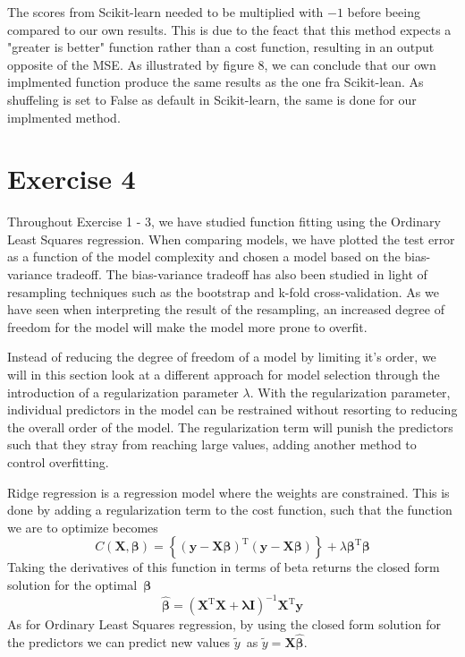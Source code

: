 \documentclass[11pt, a4paper]{article}
\begin{document}
The scores from Scikit-learn needed to be multiplied with $-1$ before beeing compared to our own results. This is due to the feact that this method expects a "greater is better" function rather than a cost function, resulting in an output opposite of the MSE.\cite{Geron2019} As illustrated by figure 8, we can conclude that our own implmented function produce the same results as the one fra Scikit-lean. As shuffeling is set to False as default in Scikit-learn, the same is done for our implmented method.





\section*{Exercise 4}
Throughout Exercise 1 - 3, we have studied function fitting using the Ordinary Least Squares regression. When comparing models, we have plotted the test error as a function of the model complexity and chosen a model based on the bias-variance tradeoff. The bias-variance tradeoff has also been studied in light of resampling techniques such as the bootstrap and k-fold cross-validation. As we have seen when interpreting the result of the resampling, an increased degree of freedom for the model will make the model more prone to overfit.

Instead of reducing the degree of freedom of a model by limiting it's order, we will in this section look at a different approach for model selection through the introduction of a regularization parameter $\lambda$. With the regularization parameter, individual predictors in the model can be restrained without resorting to reducing the overall order of the model. The regularization term will punish the predictors such that they stray from reaching large values, adding another method to control overfitting. \cite{Bishop2016}

Ridge regression is a regression model where the weights are constrained. \cite{Geron2019} This is done by adding a regularization term to the cost function, such that the function we are to optimize becomes
\[
  C\left(\bm{X},\bm{\beta}\right) = \left\{\left(\bm{y}-\bm{X}\bm{\beta}\right)^\text{T}\left(\bm{y}-\bm{X}\bm{\beta}\right)\right\}+\lambda\bm{\beta}^\text{T}\bm{\beta}
\]
Taking the derivatives of this function in terms of beta returns the closed form solution for the optimal $\bm{\beta}$
\[
  \bm{\hat{\beta}} = \left(\bm{X}^\text{T}\bm{X} + \bm{\lambda}\bm{I}\right)^{-1}\bm{X}^\text{T}\bm{y}
\]
As for Ordinary Least Squares regression, by using the closed form solution for the predictors we can predict new values $\tilde{y}$ as $\tilde{y} = \bm{X}\bm{\hat{\beta}}$.
\end{document}
